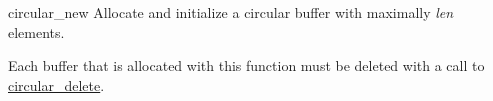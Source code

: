 \begin{DoxyDocu}{circular\_new}
\label{circular_8h_a87c3cd901fa3ddae66945be3ae09d12d_a87c3cd901fa3ddae66945be3ae09d12d}
Allocate and initialize a circular buffer with maximally {\itshape len} elements.

Each buffer that is allocated with this function must be deleted with a call to \hyperlink{circular_8h_a43f4274890d4b8368ffe2f8ca7d9471d_a43f4274890d4b8368ffe2f8ca7d9471d}{circular\_delete}.

\end{DoxyDocu}
